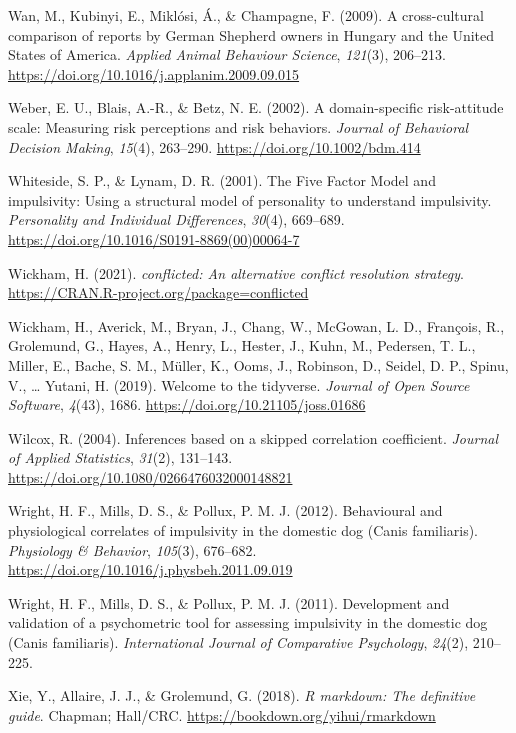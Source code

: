 \documentclass[
  pub,floatsintext]{apa6}
\newlength{\cslhangindent}
\newlength{\cslentryspacingunit} %
\newenvironment{CSLReferences}[2] %
 {%
  \setlength{\parindent}{0pt}
  \ifodd #1
  \let\oldpar\par
  \def\par{\hangindent=\cslhangindent\oldpar}
  \fi
  \setlength{\parskip}{#2\cslentryspacingunit}
 }%
 {}
\begin{document}
\begin{CSLReferences}{1}{0}
\leavevmode{}%
Wan, M., Kubinyi, E., Miklósi, Á., \& Champagne, F. (2009). A cross-cultural comparison of reports by {German Shepherd} owners in {Hungary} and the {United States} of {America}. \emph{Applied Animal Behaviour Science}, \emph{121}(3), 206--213. \url{https://doi.org/10.1016/j.applanim.2009.09.015}

\leavevmode{}%
Weber, E. U., Blais, A.-R., \& Betz, N. E. (2002). A domain-specific risk-attitude scale: Measuring risk perceptions and risk behaviors. \emph{Journal of Behavioral Decision Making}, \emph{15}(4), 263--290. \url{https://doi.org/10.1002/bdm.414}

\leavevmode{}%
Whiteside, S. P., \& Lynam, D. R. (2001). The {Five Factor Model} and impulsivity: Using a structural model of personality to understand impulsivity. \emph{Personality and Individual Differences}, \emph{30}(4), 669--689. \url{https://doi.org/10.1016/S0191-8869(00)00064-7}

\leavevmode{}%
Wickham, H. (2021). \emph{{conflicted}: An alternative conflict resolution strategy}. \url{https://CRAN.R-project.org/package=conflicted}

\leavevmode{}%
Wickham, H., Averick, M., Bryan, J., Chang, W., McGowan, L. D., François, R., Grolemund, G., Hayes, A., Henry, L., Hester, J., Kuhn, M., Pedersen, T. L., Miller, E., Bache, S. M., Müller, K., Ooms, J., Robinson, D., Seidel, D. P., Spinu, V., \ldots{} Yutani, H. (2019). Welcome to the {tidyverse}. \emph{Journal of Open Source Software}, \emph{4}(43), 1686. \url{https://doi.org/10.21105/joss.01686}

\leavevmode{}%
Wilcox, R. (2004). Inferences based on a skipped correlation coefficient. \emph{Journal of Applied Statistics}, \emph{31}(2), 131--143. \url{https://doi.org/10.1080/0266476032000148821}

\leavevmode{}%
Wright, H. F., Mills, D. S., \& Pollux, P. M. J. (2012). Behavioural and physiological correlates of impulsivity in the domestic dog ({Canis} familiaris). \emph{Physiology \& Behavior}, \emph{105}(3), 676--682. \url{https://doi.org/10.1016/j.physbeh.2011.09.019}

\leavevmode{}%
Wright, H. F., Mills, D. S., \& Pollux, P. M. J. (2011). Development and validation of a psychometric tool for assessing impulsivity in the domestic dog ({Canis} familiaris). \emph{International Journal of Comparative Psychology}, \emph{24}(2), 210--225.

\leavevmode{}%
Xie, Y., Allaire, J. J., \& Grolemund, G. (2018). \emph{R markdown: The definitive guide}. Chapman; Hall/CRC. \url{https://bookdown.org/yihui/rmarkdown}

\end{CSLReferences}
\end{document}
